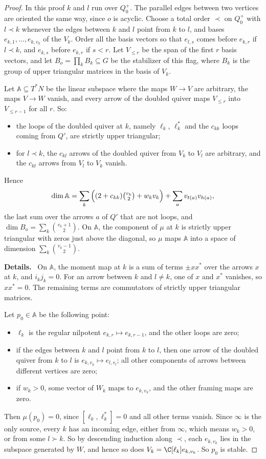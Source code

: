 \documentclass[11pt]{amsart}
\newenvironment{details}{\par\color{black!60!green}\noindent\textbf{Details.}\ }{\par}
\begin{document}
\begin{proof}
In this proof $k$ and $l$ run over $Q_0^+$.  The parallel edges between two
vertices are oriented the same way, since $o$ is acyclic.  Choose a total order $\prec$ on $Q_0^+$ with $l\prec k$
whenever the edges between $k$ and $l$ point from $k$ to $l$, and bases
$e_{k,1},\dots,e_{k,v_k}$ of the $V_k$.  Order all the basis vectors so that
$e_{l,s}$ comes before $e_{k,r}$ if $l\prec k$, and $e_{k,s}$ before $e_{k,r}$
if $s<r$.  Let $V_{\le r}$ be the span of the first $r$ basis vectors, and let
$B_o=\prod_kB_k\subseteq G$ be the stabilizer of this flag, where $B_k$ is the
group of upper triangular matrices in the basis of $V_k$.

Let $\mathbb A\subseteq T^*N$ be the linear subspace where the maps $W\to V$
are arbitrary, the maps $V\to W$ vanish, and every arrow of the doubled
quiver maps $V_{\le r}$ into $V_{\le r-1}$ for all $r$.  So:
\begin{itemize}[leftmargin=2em]
\item the loops of the doubled quiver at $k$, namely $\ell_k$, $\ell_k^*$ and
the $c_{kk}$ loops coming from $Q'$, are strictly upper triangular;
\item for $l\prec k$, the $c_{kl}$ arrows of the doubled quiver from $V_k$
to $V_l$ are arbitrary, and the $c_{kl}$ arrows from $V_l$ to $V_k$ vanish.
\end{itemize}
Hence
\[
 \dim\mathbb A=\sum_k\Big((2+c_{kk})\tbinom{v_k}2+w_kv_k\Big)
 +\sum_av_{t(a)}v_{h(a)},
\]
the last sum over the arrows $a$ of $Q'$ that are not loops, and
$\dim B_o=\sum_k\binom{v_k+1}2$.  On $\mathbb A$, the component of $\mu$ at $k$
is strictly upper triangular with zeros just above the diagonal, so $\mu$ maps
$\mathbb A$ into a space of dimension $\sum_k\binom{v_k-1}2$.
\begin{details}
On
$\mathbb A$, the moment map at $k$ is a sum of terms $\pm xx^*$ over the arrows
$x$ at $k$, and $i_kj_k=0$.  For an arrow between $k$ and $l\neq k$, one of
$x$ and $x^*$ vanishes, so $xx^*=0$.  The remaining terms are commutators of
strictly upper triangular matrices.
\end{details}

Let $p_0\in\mathbb A$ be the following point:
\begin{itemize}[leftmargin=2em]
\item $\ell_k$ is the regular nilpotent $e_{k,r}\mapsto e_{k,r-1}$, and the
other loops are zero;
\item if the edges between $k$ and $l$ point from $k$ to $l$, then one
arrow of the doubled quiver from $k$ to $l$ is $e_{k,v_k}\mapsto
e_{l,v_l}$; all other components of arrows between different vertices are zero;
\item if $w_k>0$, some vector of $W_k$ maps to $e_{k,v_k}$, and the other
framing maps are zero.
\end{itemize}
Then $\mu(p_0)=0$, since $[\ell_k,\ell_k^*]=0$ and all other terms vanish.
Since $\infty$ is the only source, every $k$ has an incoming edge, either
from $\infty$, which means $w_k>0$, or from some $l\succ k$.  So by descending
induction along $\prec$, each $e_{k,v_k}$ lies in the subspace generated by
$W$, and hence so does $V_k=\C[\ell_k]e_{k,v_k}$.  So $p_0$ is stable.


\end{proof}
\end{document}
